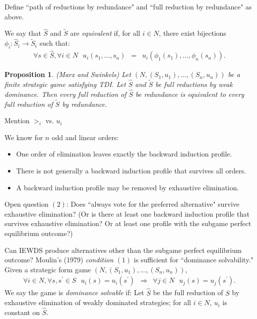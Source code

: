\documentclass[12pt]{article}
\newtheorem{propo}{Proposition}[section]
\newcommand{\n}{\noindent}
\newcommand{\s}{\vspace{5mm}}
\begin{document}
\s
\n  Define ``path of reductions by redundance" and ``full reduction by redundance" as above.

\s
\n  We say that $\widehat{S}$ and $\tilde{S}$ are \textit{equivalent} if, for all $i\in N$, there exist bijections $\phi_i:\widehat{S}_i\longrightarrow\tilde{S}_i$ such that:
\begin{eqnarray*}
\forall s\in\widehat{S},\forall i\in N\mbox{  }u_i(s_1,\hdots,s_n)&=&u_i(\phi_1(s_1),\hdots,\phi_n(s_n)).
\end{eqnarray*} 

\begin{propo} (Marx and Swinkels)  Let $\left(N,(S_1,u_1),\hdots,(S_n,u_n)\right)$ be a finite strategic game satisfying TDI.  Let $\widehat{S}$ and $\tilde{S}$ be full reductions by weak dominance.  Then every full reduction of $\widehat{S}$ be redundance is equivalent to every full reduction of $\tilde{S}$ by redundance.  
\end{propo}

\s
\n Mention $>_i$ vs. $u_i$

\s
\n  We know for $n$ odd and linear orders:
\begin{itemize}
\item One order of elimination leaves exactly the backward induction profile.
\item There is not generally a backward induction profile that survives all orders.
\item A backward induction profile may be removed by exhaustive elimination.
\end{itemize}

\s
\n Open question $(2)$:  Does ``always vote for the preferred alternative" survive exhaustive elimination?  (Or is there at least one backward induction profile that survives exhaustive elimination?  Or at least one profile with the subgame perfect equilibrium outcome?)

\s
\n  Can IEWDS produce alternatives other than the subgame perfect equilibrium outcome?  Moulin's (1979) \textit{condition $(1)$} is sufficient for ``dominance solvability."  Given a strategic form game $\left(N,(S_1,u_1),\hdots,(S_n,u_n)\right)$,
\begin{eqnarray*}
\forall i\in N,\forall s,s^{\prime}\in S\mbox{  }u_i(s)=u_i(s^{\prime})&\Longrightarrow&\forall j\in N\mbox{  } u_j(s)=u_j(s^{\prime}).
\end{eqnarray*}  We say the game is \textit{dominance solvable} if:  Let $\widehat{S}$ be the full reduction of $S$ by exhaustive elimination of weakly dominated strategies; for all $i\in N$, $u_i$ is constant on $\widehat{S}$.
\end{document}
